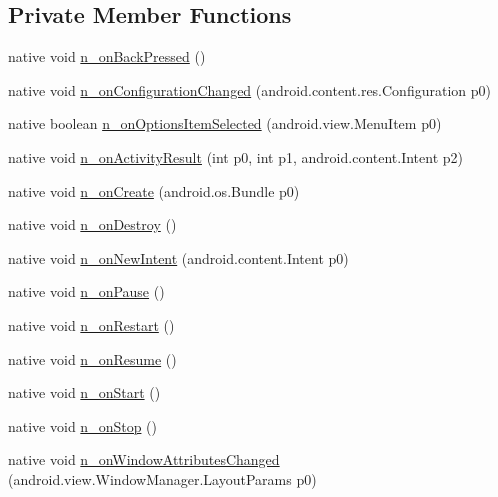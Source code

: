 \subsection*{Private Member Functions}
\begin{CompactItemize}
\item 
native void \hyperlink{classmd5b60ffeb829f638581ab2bb9b1a7f4f3f_1_1_forms_app_compat_activity_900a0e82430d75a18dc20857da07f061}{n\_\-onBackPressed} ()
\item 
native void \hyperlink{classmd5b60ffeb829f638581ab2bb9b1a7f4f3f_1_1_forms_app_compat_activity_ac0346e9a23dc8d135e4c489d5890812}{n\_\-onConfigurationChanged} (android.content.res.Configuration p0)
\item 
native boolean \hyperlink{classmd5b60ffeb829f638581ab2bb9b1a7f4f3f_1_1_forms_app_compat_activity_8fb8ee72349cccdb3dcc895b6691505e}{n\_\-onOptionsItemSelected} (android.view.MenuItem p0)
\item 
native void \hyperlink{classmd5b60ffeb829f638581ab2bb9b1a7f4f3f_1_1_forms_app_compat_activity_9a3a9d2f993a2d3b98d65006ed85bd7c}{n\_\-onActivityResult} (int p0, int p1, android.content.Intent p2)
\item 
native void \hyperlink{classmd5b60ffeb829f638581ab2bb9b1a7f4f3f_1_1_forms_app_compat_activity_6bc254edf45b4b316595aac2cc544b5e}{n\_\-onCreate} (android.os.Bundle p0)
\item 
native void \hyperlink{classmd5b60ffeb829f638581ab2bb9b1a7f4f3f_1_1_forms_app_compat_activity_e84d5e15e2d7b9edda7ccf8e486346e8}{n\_\-onDestroy} ()
\item 
native void \hyperlink{classmd5b60ffeb829f638581ab2bb9b1a7f4f3f_1_1_forms_app_compat_activity_accd04a0a7430f9e70ee90df2610b78d}{n\_\-onNewIntent} (android.content.Intent p0)
\item 
native void \hyperlink{classmd5b60ffeb829f638581ab2bb9b1a7f4f3f_1_1_forms_app_compat_activity_ea4fe8e918d3f24afc98e21a929902b1}{n\_\-onPause} ()
\item 
native void \hyperlink{classmd5b60ffeb829f638581ab2bb9b1a7f4f3f_1_1_forms_app_compat_activity_3783b96894595515b2427b3be357ff9f}{n\_\-onRestart} ()
\item 
native void \hyperlink{classmd5b60ffeb829f638581ab2bb9b1a7f4f3f_1_1_forms_app_compat_activity_c4695a81cd284f446b5d5c06277b1702}{n\_\-onResume} ()
\item 
native void \hyperlink{classmd5b60ffeb829f638581ab2bb9b1a7f4f3f_1_1_forms_app_compat_activity_1e522f4d0bb635a904fc02a3a97b39ae}{n\_\-onStart} ()
\item 
native void \hyperlink{classmd5b60ffeb829f638581ab2bb9b1a7f4f3f_1_1_forms_app_compat_activity_b7c94c6c915fe0f4d4fcc246e42ed92b}{n\_\-onStop} ()
\item 
native void \hyperlink{classmd5b60ffeb829f638581ab2bb9b1a7f4f3f_1_1_forms_app_compat_activity_927f9e61afb997958c9cc42cc18ef610}{n\_\-onWindowAttributesChanged} (android.view.WindowManager.LayoutParams p0)
\end{CompactItemize}
